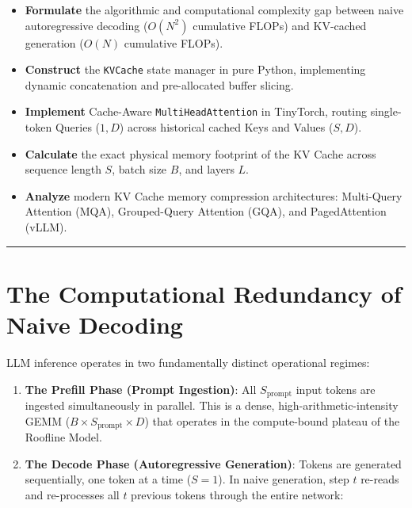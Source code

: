 \documentclass[
  letterpaper,
]{scrbook}
\providecommand{\tightlist}{%
  \setlength{\itemsep}{0pt}\setlength{\parskip}{0pt}}
\begin{document}
\begin{itemize}
\tightlist
\item
  \textbf{Formulate} the algorithmic and computational complexity gap
  between naive autoregressive decoding (\(O(N^2)\) cumulative FLOPs)
  and KV-cached generation (\(O(N)\) cumulative FLOPs).
\item
  \textbf{Construct} the \texttt{KVCache} state manager in pure Python,
  implementing dynamic concatenation and pre-allocated buffer slicing.
\item
  \textbf{Implement} Cache-Aware \texttt{MultiHeadAttention} in
  TinyTorch, routing single-token Queries (\(1, D\)) across historical
  cached Keys and Values (\(S, D\)).
\item
  \textbf{Calculate} the exact physical memory footprint of the KV Cache
  across sequence length \(S\), batch size \(B\), and layers \(L\).
\item
  \textbf{Analyze} modern KV Cache memory compression architectures:
  Multi-Query Attention (MQA), Grouped-Query Attention (GQA), and
  PagedAttention (vLLM).
\end{itemize}

\begin{center}\rule{0.5\linewidth}{0.5pt}\end{center}

\section{The Computational Redundancy of Naive
Decoding}\label{the-computational-redundancy-of-naive-decoding}

LLM inference operates in two fundamentally distinct operational
regimes:

\begin{enumerate}
\def\labelenumi{\arabic{enumi}.}
\tightlist
\item
  \textbf{The Prefill Phase (Prompt Ingestion)}: All
  \(S_{\text{prompt}}\) input tokens are ingested simultaneously in
  parallel. This is a dense, high-arithmetic-intensity GEMM
  (\(B \times S_{\text{prompt}} \times D\)) that operates in the
  compute-bound plateau of the Roofline Model.
\item
  \textbf{The Decode Phase (Autoregressive Generation)}: Tokens are
  generated sequentially, one token at a time (\(S=1\)). In naive
  generation, step \(t\) re-reads and re-processes all \(t\) previous
  tokens through the entire network:
\end{enumerate}
\end{document}

